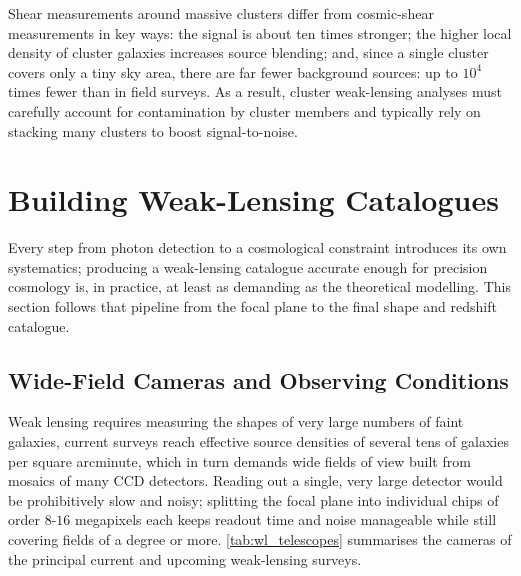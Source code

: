 \begin{observationblock}
Shear measurements around massive clusters differ from cosmic-shear measurements in key ways: the signal is about ten times stronger; the higher local density of cluster galaxies increases source blending; and, since a single cluster covers only a tiny sky area, there are far fewer background sources: up to $10^4$ times fewer than in field surveys. As a result, cluster weak-lensing analyses must carefully account for contamination by cluster members and typically rely on stacking many clusters to boost signal-to-noise.
\end{observationblock}

\section{Building Weak-Lensing Catalogues} \label{sec:wl_catalogues}

Every step from photon detection to a cosmological constraint introduces its own systematics; producing a weak-lensing catalogue accurate enough for precision cosmology is, in practice, at least as demanding as the theoretical modelling. This section follows that pipeline from the focal plane to the final shape and redshift catalogue.

\subsection{Wide-Field Cameras and Observing Conditions} \label{subsec:wl_cameras}

Weak lensing requires measuring the shapes of very large numbers of faint galaxies, current surveys reach effective source densities of several tens of galaxies per square arcminute, which in turn demands wide fields of view built from mosaics of many CCD detectors. Reading out a single, very large detector would be prohibitively slow and noisy; splitting the focal plane into individual chips of order $8$-$16$ megapixels each keeps readout time and noise manageable while still covering fields of a degree or more. \cref{tab:wl_telescopes} summarises the cameras of the principal current and upcoming weak-lensing surveys.

